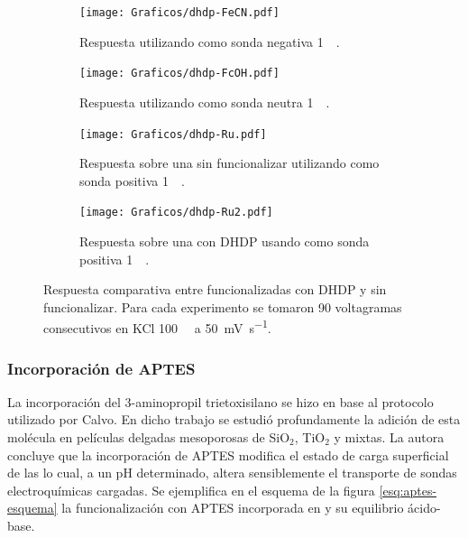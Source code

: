 					\begin{figure}[bh!]	
					\begin{subfigure}[t]{0.495\textwidth}
			 	    \texttt{[image: Graficos/dhdp-FeCN.pdf]}
			        \caption{Respuesta utilizando como sonda negativa \ferroferri\space \SI{1}{\milli\Molar}.}
			        \vspace*{4mm}
			        \label{fig:dhdp-vc-fe}
			        \end{subfigure}
			         \begin{subfigure}[t]{0.495\textwidth}
			 	    \texttt{[image: Graficos/dhdp-FcOH.pdf]}
			        \caption{Respuesta utilizando como sonda neutra \fc\space \SI{1}{\milli\Molar}.}
			        \vspace*{4mm}
			        \label{fig:dhdp-vc-fc}
			        \end{subfigure}
			        \begin{subfigure}[t]{0.495\textwidth}
			 	    \texttt{[image: Graficos/dhdp-Ru.pdf]}
			        \caption{Respuesta sobre una \pdmZ\space sin funcionalizar utilizando como sonda positiva \aminorutenio\space \SI{1}{\milli\Molar}.}
			        \label{fig:dhdp-vc-ru}
			        \end{subfigure}
			        \begin{subfigure}[t]{0.495\textwidth}
			 	    \texttt{[image: Graficos/dhdp-Ru2.pdf]}
			        \caption{Respuesta sobre una \pdmZ\space con DHDP usando como sonda positiva \aminorutenio\space \SI{1}{\milli\Molar}.}
			        \label{fig:dhdp-vc-ru2}
			        \end{subfigure}
			        \caption[Voltagramas de \pdmZ$^P_3$ con \aminorutenio, \fc\space y \ferroferri]{Respuesta comparativa entre \pdmZ\space funcionalizadas con DHDP y sin funcionalizar. Para cada experimento se tomaron 90 voltagramas consecutivos en KCl \SI{100}{\milli\Molar} a \SI{50}{\milli\volt\per\second}.}
			        \label{fig:dhdp-vc}
			      	\end{figure}

		\subsubsection{Incorporación de APTES}
			
			La incorporación del 3-aminopropil trietoxisilano se hizo en base al protocolo utilizado por Calvo\cite{Calvo20210}. En dicho trabajo se estudió profundamente la adición de esta molécula en películas delgadas mesoporosas de SiO$_2$, TiO$_2$ y mixtas. La autora concluye que la incorporación de APTES modifica el estado de carga superficial de las \pdm\space lo cual, a un pH determinado, altera sensiblemente el transporte de sondas electroquímicas cargadas. Se ejemplifica en el esquema de la figura \ref{esq:aptes-esquema} la funcionalización con APTES incorporada en \pdmZ\space y su equilibrio ácido-base.

